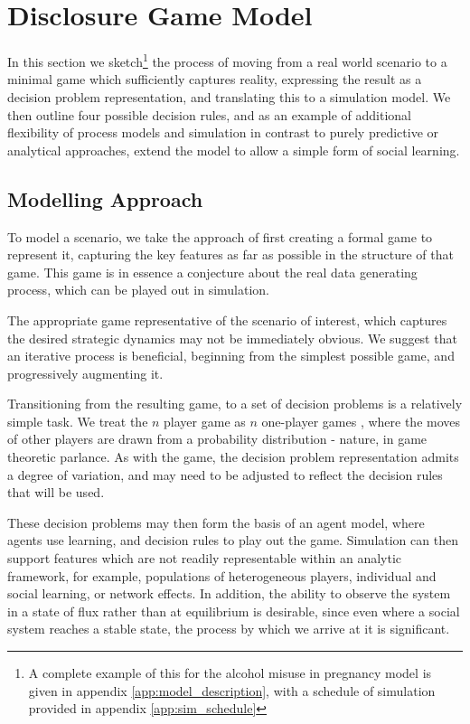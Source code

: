 \section{Disclosure Game Model}
\label{sec:midwives_model}

In this section we sketch\footnote{A complete example of this for the alcohol misuse in pregnancy model is given in appendix \ref{app:model_description}, with a schedule of simulation provided in appendix \ref{app:sim_schedule}} the process of moving from a real world scenario to a minimal game which sufficiently captures reality, expressing the result as a decision problem representation, and translating this to a simulation model. We then outline four possible decision rules, and as an example of additional flexibility of process models and simulation in contrast to purely predictive or analytical approaches, extend the model to allow a simple form of social learning.


\subsection{Modelling Approach}
\label{sec:model_design}

To model a scenario, we take the approach of first creating a formal game to represent it, capturing the key features as far as possible in the structure of that game. This game is in essence a conjecture about the real data generating process, which can be played out in simulation.

The appropriate game representative of the scenario of interest, which captures the desired strategic dynamics may not be immediately obvious. We suggest that an iterative process is beneficial, beginning from the simplest possible game, and progressively augmenting it.

Transitioning from the resulting game, to a set of decision problems is a relatively simple task. We treat the $n$ player game as $n$ one-player games \citep{RiosInsua2009}, where the moves of other players are drawn from a probability distribution - nature, in game theoretic parlance. As with the game, the decision problem representation admits a degree of variation, and may need to be adjusted to reflect the decision rules that will be used.

These decision problems may then form the basis of an agent model, where agents use learning, and decision rules to play out the game. Simulation can then support features which are not readily representable within an analytic framework, for example, populations of heterogeneous players, individual and social learning, or network effects. In addition, the ability to observe the system in a state of flux rather than at equilibrium is desirable, since even where a social system reaches a stable state, the process by which we arrive at it is significant. 

